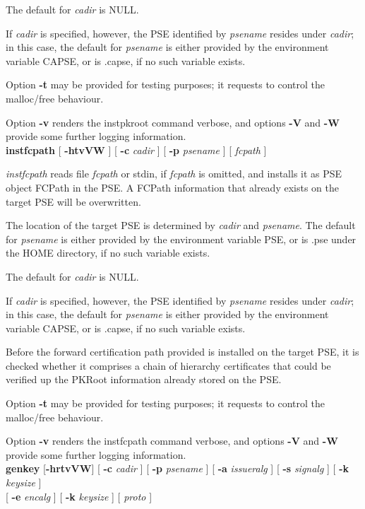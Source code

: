 The default for {\em cadir} is NULL. 

If {\em cadir} is specified,
however, the PSE identified by {\em psename} resides under {\em cadir}; in this case, the default
for {\em psename} is either provided by the environment variable CAPSE, or is .capse, if no such variable
exists.
 
Option {\bf -t} may be provided for testing purposes; it requests to control the malloc/free behaviour.

Option {\bf -v} renders the instpkroot command verbose, and options {\bf -V} and {\bf -W} 
provide some further logging
information.
\\ [1em] 
{\bf instfcpath} [ {\bf -htvVW} ] [ {\bf -c} {\em cadir} ] [ {\bf -p} {\em psename} ] [ {\em fcpath} ]

{\em instfcpath} reads file {\em fcpath} or stdin, if {\em fcpath} is omitted, and installs it as
PSE object FCPath in the PSE. A FCPath information that already exists on the target PSE will
be overwritten.
 
The location of the target PSE is determined by {\em cadir} and {\em psename}. The default for {\em 
psename} is either provided by the environment variable PSE, or is .pse under the HOME directory, if no such
variable exists. 

The default for {\em cadir} is NULL. 

If {\em cadir} is specified,
however, the PSE identified by {\em psename} resides under {\em cadir}; in this case, the default
for {\em psename} is either provided by the environment variable CAPSE, or is .capse, if no such variable
exists.

Before the forward certification path provided is installed on the target PSE, it is checked
whether it comprises a chain of hierarchy certificates that could be verified up the PKRoot 
information already stored on the PSE.
 
Option {\bf -t} may be provided for testing purposes; it requests to control the malloc/free behaviour.

Option {\bf -v} renders the instfcpath command verbose, and options {\bf -V} and {\bf -W} 
provide some further logging information.
\\ [1em]
{\bf genkey} [{\bf -hrtvVW}] [ {\bf -c} {\em cadir} ] [ {\bf -p} {\em psename} ] [ {\bf -a} {\em issueralg} ]
[ {\bf -s} {\em signalg} ] [ {\bf -k} {\em keysize} ] \\
\hspace*{2cm} [ {\bf -e} {\em encalg} ] [ {\bf -k} {\em keysize} ] [ {\em proto} ]

